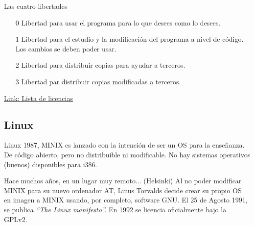 \documentclass[12pt]{beamer}
\begin{document}
\begin{frame}{Las cuatro libertades}
	\begin{itemize}
		\item[0] Libertad para usar el programa para lo que desees como lo desees.
		\item[1] Libertad para el estudio y la modificación del programa a nivel de código. Los cambios se deben poder usar.
		\item[2] Libertad para distribuir copias para ayudar a terceros.
		\item[3] Libertad par distribuir copias modificadas a terceros.
	\end{itemize}
\vfill
{}
\vfill
\href{https://www.gnu.org/licenses/license-list.html}{Link: Lista de licencias}
\end{frame}

\subsection{Linux}
\begin{frame}{Linux}
	1987, MINIX es lanzado con la intención de ser un OS para la enseñanza. De código abierto, pero no distribuible ni modificable. No hay sistemas operativos (buenos) disponibles para i386.
	\begin{block}{Hace muchos años, en un lugar muy remoto... (Helsinki)}
	Al no poder modificar MINIX para su nuevo ordenador AT, Linus Torvalds decide crear su propio OS en imagen a MINIX usando, por completo, software GNU. El 25 de Agosto 1991, se publica \textit{``The Linux manifesto''.} En 1992 se licencia oficialmente bajo la GPLv2.
	\end{block}
\end{frame}
\end{document}
